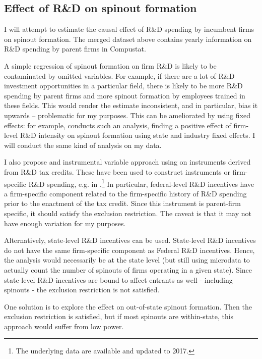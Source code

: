 \documentclass[12pt,english]{article}
\theoremstyle{remark}
\begin{document}
\subsection{Effect of R\&D on spinout formation}

I will attempt to estimate the causal effect of R\&D spending by incumbent firms on spinout formation. The merged dataset above contains yearly information on R\&D spending by parent firms in Compustat. 

A simple regression of spinout formation on firm R\&D is likely to be contaminated by omitted variables. For example, if there are a lot of R\&D investment opportunities in a particular field, there is likely to be more R\&D spending by parent firms and more spinout formation by employees trained in these fields. This would render the estimate inconsistent, and in particular, bias it upwards -- problematic for my purposes. This can be ameliorated by using fixed effects: for example, \cite{baslandze_spinout_2019} conducts such an analysis, finding a positive effect of firm-level R\&D intensity on spinout formation using state and industry fixed effects. I will conduct the same kind of analysis on my data.

I also propose and instrumental variable approach using on instruments derived from R\&D tax credits. These have been used to construct instruments or firm-specific R\&D spending, e.g. in \cite{bloom_identifying_2013}.\footnote{The underlying data are available and updated to 2017.}  
In particular, federal-level R\&D incentives have a firm-specific component related to the firm-specific history of R\&D spending prior to the enactment of the tax credit. Since this instrument is parent-firm specific, it should satisfy the exclusion restriction. The caveat is that it may not have enough variation for my purposes.

Alternatively, state-level R\&D incentives can be used. State-level R\&D incentives do not have the same firm-specific component as Federal R\&D incentives. Hence, the analysis would necessarily be at the state level (but still using microdata to actually count the number of spinouts of firms operating in a given state). Since state-level R\&D incentives are bound to affect entrants as well - including spinouts - the exclusion restriction is not satisfied. 

One solution is to explore the effect on out-of-state spinout formation. Then the exclusion restriction is satisfied, but if most spinouts are within-state, this approach would suffer from low power. 
\end{document}
